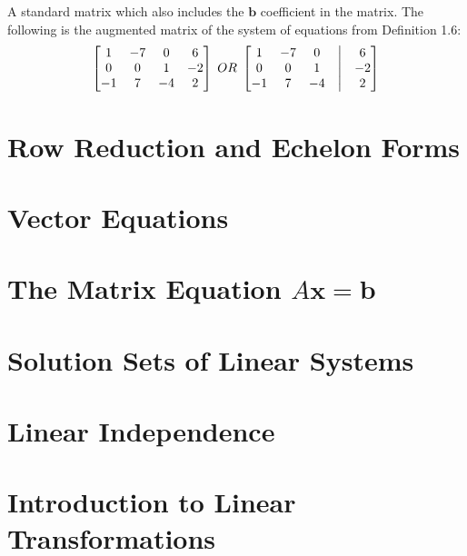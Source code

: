 \documentclass{report}
\begin{document}
\begin{definition}
A standard matrix which also includes the $\mathbf{b}$ coefficient in the matrix. The following is the augmented matrix of the system of equations from Definition 1.6:
\begin{equation*}
\begin{bmatrix}
1 & -7 & 0 & 6 \\ 
0 & 0 & 1 & -2 \\ 
-1 & 7 & -4 & 2
\end{bmatrix}
\;OR\;
\begin{bmatrix}
1 & -7 & 0 &\bigm| & 6 \\ 
0 & 0 & 1 &\bigm| & -2 \\ 
-1 & 7 & -4 &\bigm| & 2
\end{bmatrix}
\end{equation*}
\end{definition}

\section{Row Reduction and Echelon Forms}

\section{Vector Equations}

\section{The Matrix Equation $A\mathbf{x}=\mathbf{b}$}

\section{Solution Sets of Linear Systems}

\section{Linear Independence}

\section{Introduction to Linear Transformations}
\end{document}
